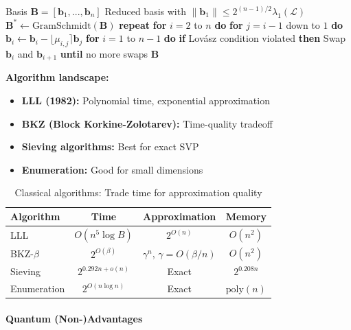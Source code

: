 \documentclass[11pt,a4paper]{article}
\begin{document}
\begin{algorithm}
\caption{LLL Algorithm (Simplified)}
\label{alg:lll}
\begin{algorithmic}[1]
\Require Basis $\mathbf{B} = [\mathbf{b}_1, ..., \mathbf{b}_n]$
\Ensure Reduced basis with $\|\mathbf{b}_1\| \leq 2^{(n-1)/2} \lambda_1(\mathcal{L})$
\State $\mathbf{B}^* \gets \text{GramSchmidt}(\mathbf{B})$ 
\State \textbf{repeat}
\State \quad \textbf{for} $i = 2$ to $n$ \textbf{do}
\State \quad \quad \textbf{for} $j = i-1$ down to $1$ \textbf{do}
\State \quad \quad \quad $\mathbf{b}_i \gets \mathbf{b}_i - \lfloor \mu_{i,j} \rceil \mathbf{b}_j$ 
\State \quad \textbf{for} $i = 1$ to $n-1$ \textbf{do}
\State \quad \quad \textbf{if} Lovász condition violated \textbf{then}
\State \quad \quad \quad Swap $\mathbf{b}_i$ and $\mathbf{b}_{i+1}$
\State \textbf{until} no more swaps
\State \Return $\mathbf{B}$
\end{algorithmic}
\end{algorithm}

\textbf{Algorithm landscape:}
\begin{itemize}
    \item \textbf{LLL (1982):} Polynomial time, exponential approximation
    \item \textbf{BKZ (Block Korkine-Zolotarev):} Time-quality tradeoff
    \item \textbf{Sieving algorithms:} Best for exact SVP
    \item \textbf{Enumeration:} Good for small dimensions
\end{itemize}

\begin{table}[h]
\centering
\begin{tabular}{|l|c|c|c|}
\hline
\textbf{Algorithm} & \textbf{Time} & \textbf{Approximation} & \textbf{Memory} \\
\hline
LLL & $O(n^5 \log B)$ & $2^{O(n)}$ & $O(n^2)$ \\
BKZ-$\beta$ & $2^{O(\beta)}$ & $\gamma^n$, $\gamma = O(\beta/n)$ & $O(n^2)$ \\
Sieving & $2^{0.292n + o(n)}$ & Exact & $2^{0.208n}$ \\
Enumeration & $2^{O(n \log n)}$ & Exact & $\text{poly}(n)$ \\
\hline
\end{tabular}
\caption{Classical algorithms: Trade time for approximation quality}
\end{table}

\paragraph{Quantum (Non-)Advantages}
\end{document}
